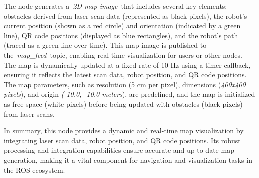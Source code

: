 \documentclass[a4paper,12pt]{extreport}
\begin{document}
\newpage
The node generates a~\emph{2D map image}~that includes several key
elements: obstacles derived from laser scan data (represented as black
pixels), the robot's current position (shown as a red circle) and
orientation (indicated by a green line), QR code positions (displayed as
blue rectangles), and the robot's path (traced as a green line over
time). This map image is published to the~\emph{map\_feed}~topic,
enabling real-time visualization for users or other nodes. The map is
dynamically updated at a fixed rate of 10 Hz using a timer callback,
ensuring it reflects the latest scan data, robot position, and QR code
positions. The map parameters, such as resolution (5 cm per pixel),
dimensions (\emph{400x400 pixels}), and origin \emph{(-10.0, -10.0
meters}), are predefined, and the map is initialized as free space
(white pixels) before being updated with obstacles (black pixels) from
laser scans.

In summary, this node provides a dynamic and real-time map visualization
by integrating laser scan data, robot position, and QR code positions.
Its robust processing and integration capabilities ensure accurate and
up-to-date map generation, making it a vital component for navigation
and visualization tasks in the ROS ecosystem.
\end{document}
